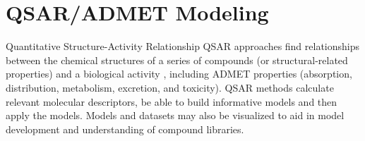 \section{QSAR/ADMET Modeling}
  
Quantitative Structure-Activity Relationship QSAR approaches find relationships between the chemical structures of a series of compounds (or structural-related properties) and a biological activity \cite{1995}, including ADMET properties (absorption, distribution, metabolism, excretion, and toxicity).  QSAR methods calculate relevant molecular descriptors, be able to build informative models and then apply the models.  Models and datasets may also be visualized to aid in model development and understanding of compound libraries.

